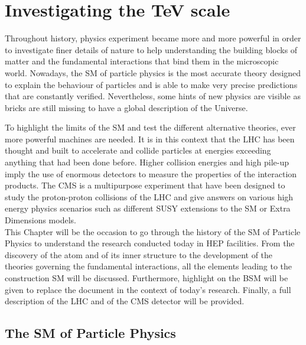 \renewcommand\evenpagerightmark{{\scshape\small Chapter 2}}
\renewcommand\oddpageleftmark{{\scshape\small Investigating the \si{TeV} scale}}

\renewcommand{\bibname}{References}

\hyphenation{}

\chapter[Investigating the \si{TeV} scale]%
{Investigating the \si{TeV} scale}
\label{chapt:2}

	Throughout history, physics experiment became more and more powerful in order to investigate finer details of nature to help understanding the building blocks of matter and the fundamental interactions that bind them in the microscopic world. Nowadays, the \acl{SM} of particle physics is the most accurate theory designed to explain the behaviour of particles and is able to make very precise predictions that are constantly verified. Nevertheless, some hints of new physics are visible as bricks are still missing to have a global description of the Universe.
	
	To highlight the limits of the SM and test the different alternative theories, ever more powerful machines are needed. It is in this context that the \acl{LHC} has been thought and built to accelerate and collide particles at energies exceeding anything that had been done before. Higher collision energies and high pile-up imply the use of enormous detectors to measure the properties of the interaction products. The \acl{CMS} is a multipurpose experiment that have been designed to study the proton-proton collisions of the LHC and give answers on various high energy physics scenarios such as different \acf{SUSY} extensions to the \acl{SM} or Extra Dimensions models.\\
	
	This Chapter will be the occasion to go through the history of the \acl{SM} of Particle Physics to understand the research conducted today in \acf{HEP} facilities. From the discovery of the atom and of its inner structure to the development of the theories governing the fundamental interactions, all the elements leading to the construction SM will be discussed. Furthermore, highlight on the \acf{BSM} will be given to replace the document in the context of today's research. Finally, a full description of the LHC and of the CMS detector will be provided.

\section{The \acl{SM} of Particle Physics}
\label{chapt2:sec:SM}

